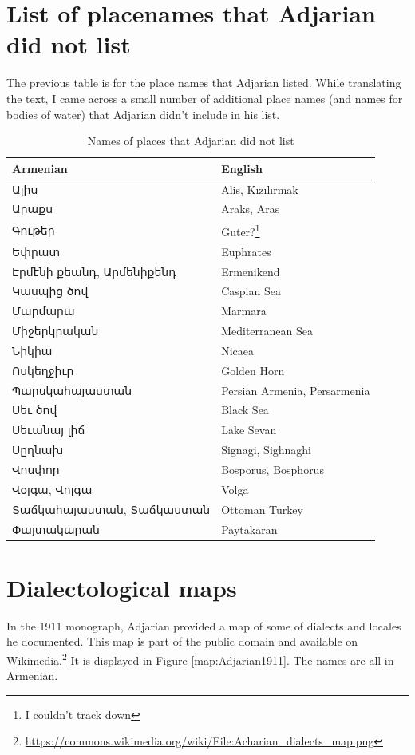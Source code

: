 \section{List of placenames that Adjarian did not list}

The previous table is for the place names that Adjarian listed. While translating the text, I came across a small number of additional place names (and names for bodies of water) that Adjarian didn't include in his list. 


\begin{table}[H]
	\centering
	\caption{Names of places that Adjarian did not list}
	\label{tab:adjarian:names:other}
	\begin{tabular}{|ll|}
		\hline 
Armenian & English \\		\hline 
		Ալիս  & Alis, Kızılırmak \\
		Արաքս &  Araks, Aras \\
		Գութեր  &  Guter?\footnote{I couldn't track down}  \\
		Եփրատ &  Euphrates \\
		Էրմէնի քեանդ, Արմենիքենդ & Ermenikend \\
		Կասպից ծով & Caspian Sea \\
		Մարմարա&  Marmara \\
		Միջերկրական & Mediterranean Sea \\ 
		Նիկիա&   Nicaea \\
		Ոսկեղջիւր  & Golden Horn \\
		Պարսկահայաստան & Persian Armenia, Persarmenia \\
		Սեւ ծով &  Black Sea\\
		Սեւանայ լիճ  & Lake Sevan \\
		Սըղնախ & Signagi, Sighnaghi \\
		Վոսփոր & Bosporus, Bosphorus \\ 
		Վօլգա, Վոլգա & Volga \\
		Տաճկահայաստան, Տաճկաստան & Ottoman Turkey \\
		Փայտակարան & Paytakaran \\ \hline 
	\end{tabular}
\end{table}


\newpagecheat
\section{Dialectological maps}

In the 1911 monograph, Adjarian provided a map of some of dialects and locales he documented. This map is part of the public domain and available on Wikimedia.\footnote{\url{https://commons.wikimedia.org/wiki/File:Acharian_dialects_map.png}} It is displayed in Figure \ref{map:Adjarian1911}. The names are all in Armenian. 

